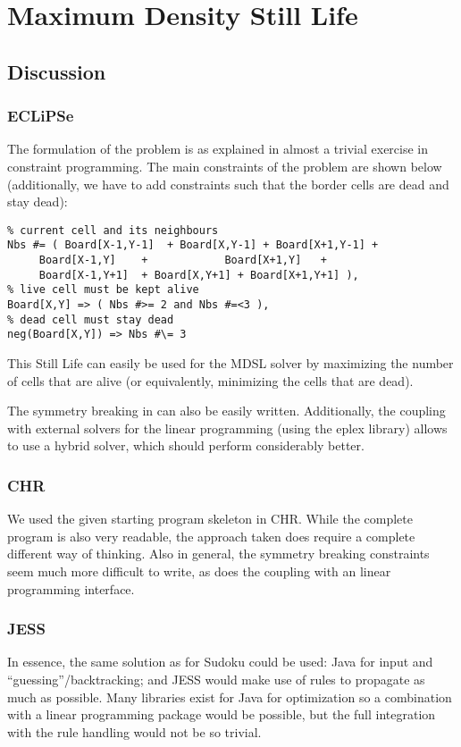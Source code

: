 
\section{Maximum Density Still Life}
\subsection{Discussion}
\subsubsection{ECLiPSe}
The formulation of the problem is as explained in \cite{paper_still,paper_still2} almost a trivial exercise in constraint programming.
The main constraints of the problem are shown below (additionally, we have to add constraints such that the border cells are dead and stay dead):
\begin{lstlisting}
% current cell and its neighbours	
Nbs #= ( Board[X-1,Y-1]  + Board[X,Y-1] + Board[X+1,Y-1] + 
	 Board[X-1,Y]    +  		  Board[X+1,Y]   + 
	 Board[X-1,Y+1]  + Board[X,Y+1] + Board[X+1,Y+1] ),
% live cell must be kept alive		 
Board[X,Y] => ( Nbs #>= 2 and Nbs #=<3 ),	 
% dead cell must stay dead
neg(Board[X,Y]) => Nbs #\= 3
\end{lstlisting}

This Still Life can easily be used for the MDSL solver by maximizing the number of cells that are alive (or equivalently, minimizing the cells that are dead).

The symmetry breaking in \cite{paper_still,paper_still2} can also be easily written.
Additionally, the coupling with external solvers for the linear programming (using the eplex library) allows to use a hybrid solver, which should perform considerably better.

\subsubsection{CHR}
We used the given starting program skeleton in CHR.
While the complete program is also very readable, the approach taken does require a complete different way of thinking. Also in general, the symmetry breaking constraints seem much more difficult to write, as does the coupling with an linear programming interface.



\subsubsection{JESS}
In essence, the same solution as for Sudoku could be used: Java for
input and ``guessing''/backtracking; and JESS would make use of rules to
propagate as much as possible. Many libraries exist for Java for optimization so a combination with a linear programming package would be possible, but the full integration with the rule handling would not be so trivial.

